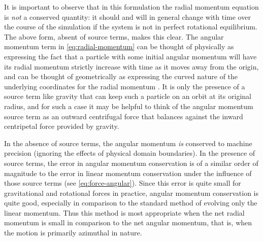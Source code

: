 \documentclass[12pt]{article}
\begin{document}
It is important to observe that in this formulation the radial momentum equation
is \textit{not} a conserved quantity: it should and will in general change with
time over the course of the simulation if the system is not in perfect rotational
equilibrium. The above form, absent of source terms, makes this clear. The angular momentum term in
\autoref{eq:radial-momentum} can be thought of physically as expressing the fact
that a particle with some initial angular momentum will have its radial momentum
strictly increase with time as it moves away from the origin, and can be thought of geometrically
as expressing the curved nature of the underlying coordinates for the radial momentum
\citep{motl:2002}. It is only the presence of a source term like gravity that can keep
such a particle on an orbit at its original radius, and for such a case it may be helpful
to think of the angular momentum source term as an outward centrifugal force that
balances against the inward centripetal force provided by gravity.

In the absence of source terms, the angular momentum \textit{is} conserved
to machine precision (ignoring the effects of physical domain boundaries). In the
presence of source terms, the error in angular momentum conservation is of a
similar order of magnitude to the error in linear momentum conservation under
the influence of those source terms (see \autoref{eq:force-angular}). Since this
error is quite small for gravitational and rotational forces in practice, angular
momentum conservation is quite good, especially in comparison to the standard
method of evolving only the linear momentum. Thus this method is most appropriate
when the net radial momentum is small in comparison to the net angular momentum,
that is, when the motion is primarily azimuthal in nature.
\end{document}
